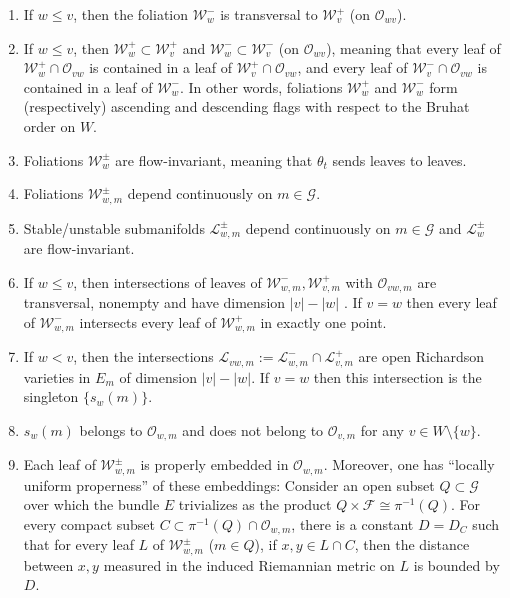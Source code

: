 \documentclass[12pt]{amsbook}%
\theoremstyle{definition}
\theoremstyle{remark}
\numberwithin{section}{chapter}
\numberwithin{subsection}{section}
\numberwithin{figure}{chapter}
\def\cF{{\mathscr{F}}}
\def\cO{{\mathscr{O}}}
\def\cW{{\mathscr{W}}}
\def\cG{{\mathscr{G}}}
\def\cL{{\mathscr{L}}}
\def\kap{}
\begin{document}
{{\begin{enumerate}
\item If $w\le v$, then the foliation $\cW^-_{w}$ is transversal to $\cW^+_{v}$ (on $ \cO_{wv}$). 

\item If $w\le v$, then  $\cW^+_{w}\subset \cW^+_{v}$ and  
$\cW^-_{w}\subset \cW^-_{v}$ (on $ \cO_{wv}$), meaning that every leaf of  $\cW^+_{w}\cap \cO_{vw}$ is contained in a leaf of 
$\cW^+_{v}\cap \cO_{vw}$, and every leaf of  $\cW^-_{v}\cap \cO_{vw}$ is contained in a leaf of $\cW^-_{w}$. 
In other words, foliations $\cW^+_{w}$ and $\cW^-_{w}$ 
form (respectively) ascending and descending flags with respect to the Bruhat order on $W$. 

\item 
Foliations $\cW^\pm_{w}$ are flow-invariant, meaning that $\theta_t$ sends leaves to leaves. 

\item Foliations $\cW^\pm_{w,m}$ depend continuously on $m\in \cG$. 

\item Stable/unstable submanifolds $\cL^\pm_{w,m}$ depend  continuously on $m\in \cG$ and $\cL^\pm_{w}$ are flow-invariant.  

\item If $w\le v$, then intersections of leaves of $\cW^-_{w,m}, \cW^+_{v,m}$ with $\cO_{vw,m}$ 
are transversal, nonempty and have dimension $|v|-|w|$ . If $v=w$ then every leaf of 
 $\cW^-_{w,m}$ intersects every leaf of $\cW^+_{w,m}$ in exactly one point. 

\item If $w< v$, then the intersections $\cL_{vw,m}:=\cL^-_{w,m}\cap \cL^+_{v,m}$  
are open Richardson varieties in $E_m$ of dimension $|v|-|w|$. If $v=w$ then this intersection is the singleton $\{s_w(m)\}$.

\item $s_w(m)$ belongs to $\cO_{w,m}$ and does not belong to $\cO_{v,m}$ for any $v\in W\setminus \{w\}$. 

\item Each leaf of $\cW^\pm_{w,m}$ is properly embedded in $\cO_{w,m}$. Moreover, one has ``locally uniform properness'' of these embeddings: 
Consider an open subset $Q\subset \cG$ over which the bundle $E$ trivializes as the product $Q\times \cF\cong \pi^{-1}(Q)$. 
For every compact subset $C\subset  \pi^{-1}(Q) \cap \cO_{w,m}$, there is a constant $D=D_C$ such that 
for every leaf $L$ of $\cW^\pm_{w,m}$ ($m\in Q$), if $x, y\in L\cap C$, then the distance between $x, y$ measured in the induced Riemannian metric on $L$ is bounded by $D$. 


\end{enumerate}}}
\end{document}
